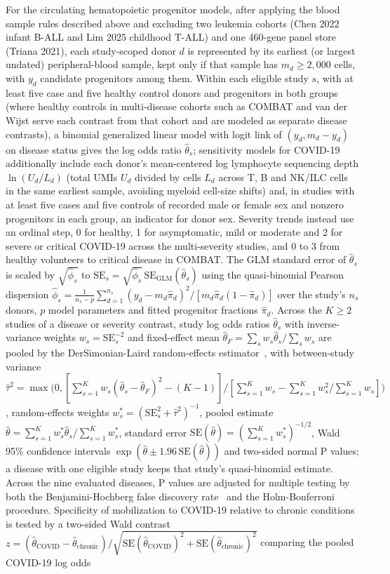 \documentclass[11pt]{article}
\begin{document}
For the circulating hematopoietic progenitor models, after applying the blood sample rules described above and excluding two leukemia cohorts (Chen 2022 infant B-ALL and Lim 2025 childhood T-ALL) and one 460-gene panel store (Triana 2021), each study-scoped donor $d$ is represented by its earliest (or largest undated) peripheral-blood sample, kept only if that sample has $m_d\ge2{,}000$ cells, with $y_d$ candidate progenitors among them. Within each eligible study $s$, with at least five case and five healthy control donors and progenitors in both groups (where healthy controls in multi-disease cohorts such as COMBAT and van der Wijst serve each contrast from that cohort and are modeled as separate disease contrasts), a binomial generalized linear model with logit link of $(y_d,m_d-y_d)$ on disease status gives the log odds ratio $\hat\theta_s$; sensitivity models for COVID-19 additionally include each donor's mean-centered log lymphocyte sequencing depth $\ln(U_d/L_d)$ (total UMIs $U_d$ divided by cells $L_d$ across T, B and NK/ILC cells in the same earliest sample, avoiding myeloid cell-size shifts) and, in studies with at least five cases and five controls of recorded male or female sex and nonzero progenitors in each group, an indicator for donor sex. Severity trends instead use an ordinal step, 0 for healthy, 1 for asymptomatic, mild or moderate and 2 for severe or critical COVID-19 across the multi-severity studies, and 0 to 3 from healthy volunteers to critical disease in COMBAT. The GLM standard error of $\hat\theta_s$ is scaled by $\sqrt{\hat\phi_s}$ to $\mathrm{SE}_s=\sqrt{\hat\phi_s}\,\mathrm{SE}_{\mathrm{GLM}}(\hat\theta_s)$ using the quasi-binomial Pearson dispersion $\hat\phi_s=\frac{1}{n_s-p}\sum_{d=1}^{n_s}(y_d-m_d\hat\pi_d)^{2}/[m_d\hat\pi_d(1-\hat\pi_d)]$ over the study's $n_s$ donors, $p$ model parameters and fitted progenitor fractions $\hat\pi_d$. Across the $K\ge2$ studies of a disease or severity contrast, study log odds ratios $\hat\theta_s$ with inverse-variance weights $w_s=\mathrm{SE}_s^{-2}$ and fixed-effect mean $\hat\theta_F=\sum_s w_s\hat\theta_s/\sum_s w_s$ are pooled by the DerSimonian-Laird random-effects estimator~\cite{dersimonian1986metaanalysis}, with between-study variance $\hat\tau^{2}=\max\bigl(0,[\sum_{s=1}^{K}w_s(\hat\theta_s-\hat\theta_F)^{2}-(K-1)]/[\sum_{s=1}^{K}w_s-\sum_{s=1}^{K}w_s^{2}/\sum_{s=1}^{K}w_s]\bigr)$, random-effects weights $w_s^{*}=(\mathrm{SE}_s^{2}+\hat\tau^{2})^{-1}$, pooled estimate $\hat\theta=\sum_{s=1}^{K}w_s^{*}\hat\theta_s/\sum_{s=1}^{K}w_s^{*}$, standard error $\mathrm{SE}(\hat\theta)=(\sum_{s=1}^{K}w_s^{*})^{-1/2}$, Wald 95\% confidence intervals $\exp(\hat\theta\pm1.96\,\mathrm{SE}(\hat\theta))$ and two-sided normal P values; a disease with one eligible study keeps that study's quasi-binomial estimate. Across the nine evaluated diseases, P values are adjusted for multiple testing by both the Benjamini-Hochberg false discovery rate~\cite{benjamini1995controlling} and the Holm-Bonferroni procedure. Specificity of mobilization to COVID-19 relative to chronic conditions is tested by a two-sided Wald contrast $z=(\hat\theta_{\mathrm{COVID}}-\hat\theta_{\mathrm{chronic}})/\sqrt{\mathrm{SE}(\hat\theta_{\mathrm{COVID}})^{2}+\mathrm{SE}(\hat\theta_{\mathrm{chronic}})^{2}}$ comparing the pooled COVID-19 log odds 
\end{document}
